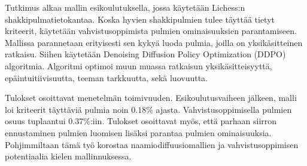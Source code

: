 \documentclass[english, 12pt, a4paper, sci, utf8, a-2b, online]{aaltothesis}
\theoremstyle{definition}
\theoremstyle{plain}
\theoremstyle{remark}
\begin{document}
\begin{abstractpage}[finnish]

    Tutkimus alkaa mallin esikoulutuksella, jossa käytetään Lichess:n shakkipulmatietokantaa. Koska hyvien shakkipulmien tulee täyttää tietyt kriteerit, käytetään vahvistusoppimista pulmien ominaisuuksien parantamiseen. Mallissa parannetaan erityisesti sen kykyä luoda pulmia, joilla on yksikäsitteinen ratkaisu. Siihen käytetään Denoising Diffusion Policy Optimization (DDPO) algoritmia. Algoritmi optimoi muun muassa ratkaisun yksikäsitteisyyttä, epäintuitiivisuutta, teeman tarkkuutta, sekä luovuutta.


    Tulokset osoittavat menetelmän toimivuuden. Esikoulutusvaiheen jälkeen, malli loi kriteerit täyttäviä pulmia noin $0.18\%$ ajasta. Vahvistusoppimisella pulmien osuus tuplaantui $0.37\%$:iin. Tulokset osoittavat myös, että parhaan siirron ennustaminen pulmien luomisen lisäksi parantaa pulmien ominaisuuksia. Pohjimmiltaan tämä työ korostaa naamiodiffuusiomallien ja vahvistusoppimisen potentiaalia kielen mallinnuksessa.

\end{abstractpage}
\end{document}
